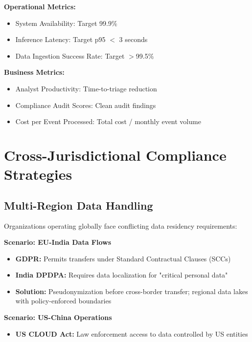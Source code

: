 \textbf{Operational Metrics:}
\begin{itemize}
    \item System Availability: Target 99.9\%
    \item Inference Latency: Target p95 $<$ 3 seconds
    \item Data Ingestion Success Rate: Target $>$99.5\%
\end{itemize}

\textbf{Business Metrics:}
\begin{itemize}
    \item Analyst Productivity: Time-to-triage reduction
    \item Compliance Audit Scores: Clean audit findings
    \item Cost per Event Processed: Total cost / monthly event volume
\end{itemize}

\section{Cross-Jurisdictional Compliance Strategies}\label{sec:policy-crossjurisdiction}
\subsection{Multi-Region Data Handling}
Organizations operating globally face conflicting data residency requirements:

\textbf{Scenario: EU-India Data Flows}
\begin{itemize}
    \item \textbf{GDPR:} Permits transfers under Standard Contractual Clauses (SCCs)
    \item \textbf{India DPDPA:} Requires data localization for "critical personal data"
    \item \textbf{Solution:} Pseudonymization before cross-border transfer; regional data lakes with policy-enforced boundaries
\end{itemize}

\textbf{Scenario: US-China Operations}
\begin{itemize}
    \item \textbf{US CLOUD Act:} Law enforcement access to data controlled by US entities
    \item \textbf{China Cybersecurity Law:} Mandates local storage and government access
    \item \textbf{Solution:} Separate deployments per region; configurable data sovereignty policies
\end{itemize}

